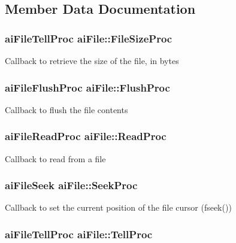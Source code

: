 \subsection{\-Member \-Data \-Documentation}
\hypertarget{structaiFile_aff2fff8c0458e7ec71f7de217c3a3033}{
\subsubsection[{\-File\-Size\-Proc}]{\setlength{\rightskip}{0pt plus 5cm}ai\-File\-Tell\-Proc {\bf ai\-File\-::\-File\-Size\-Proc}}}\label{structaiFile_aff2fff8c0458e7ec71f7de217c3a3033}
\-Callback to retrieve the size of the file, in bytes \hypertarget{structaiFile_a1102d28d1c0be68ffed20476669bdb0d}{
\subsubsection[{\-Flush\-Proc}]{\setlength{\rightskip}{0pt plus 5cm}ai\-File\-Flush\-Proc {\bf ai\-File\-::\-Flush\-Proc}}}\label{structaiFile_a1102d28d1c0be68ffed20476669bdb0d}
\-Callback to flush the file contents \hypertarget{structaiFile_a52287e81ca67b9d43cc1ce6142f781fa}{
\subsubsection[{\-Read\-Proc}]{\setlength{\rightskip}{0pt plus 5cm}ai\-File\-Read\-Proc {\bf ai\-File\-::\-Read\-Proc}}}\label{structaiFile_a52287e81ca67b9d43cc1ce6142f781fa}
\-Callback to read from a file \hypertarget{structaiFile_a7a07b499be4ad433669246479a4d4ad2}{
\subsubsection[{\-Seek\-Proc}]{\setlength{\rightskip}{0pt plus 5cm}ai\-File\-Seek {\bf ai\-File\-::\-Seek\-Proc}}}\label{structaiFile_a7a07b499be4ad433669246479a4d4ad2}
\-Callback to set the current position of the file cursor (fseek()) \hypertarget{structaiFile_aaf2d88a3b2fcbdacf51119658283d27e}{
\subsubsection[{\-Tell\-Proc}]{\setlength{\rightskip}{0pt plus 5cm}ai\-File\-Tell\-Proc {\bf ai\-File\-::\-Tell\-Proc}}}\label{structaiFile_aaf2d88a3b2fcbdacf51119658283d27e}
